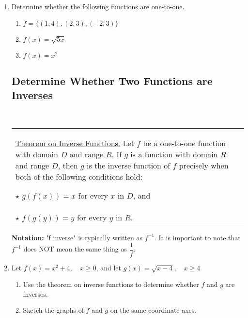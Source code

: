 \begin{enumerate}
\item Determine whether the following functions are one-to-one.
\begin{enumerate}
\item $f=\{(1,4), (2,3), (-2,3)\}$
  \vfill
\item $f(x) = \sqrt{5x}$
  \vfill
\item $f(x) = x^2$
  \vfill
\end{enumerate}



\clearpage


\subsection{Determine Whether Two Functions are Inverses} ~


\noindent \begin{tabular}{ | p{} |} \hline \noindent
\underline{Theorem on Inverse Functions.} Let $f$ be a one-to-one
function with domain $D$ and range $R$. If $g$ is a function with
domain $R$ and range $D$, then $g$ is the inverse function of $f$
precisely when both of the following conditions hold:

$ \star$ \quad $g(f(x))=x$ for every $x$ in $D$, and \\
$ \star$ \quad $f(g(y))=y$ for every $y$ in $R$.\\ \hline
\end{tabular} 

\noindent \textbf{Notation:} "f inverse" is typically written as
$f^{-1}$. It is important to note that $f^{-1}$ does NOT mean the same
thing as $\dfrac{1}{f}$.

\item Let $f(x) = x^2+4, \quad x \geq 0$, and let $g(x) = \sqrt{x-4}, \quad x \geq 4 $
\begin{enumerate}
\item Use the theorem on inverse functions to determine whether $f$
      and $g$ are inverses.

\vfill

\item Sketch the graphs of $f$ and $g$ on the same coordinate axes. \samepage \\
\end{enumerate}
\end{enumerate}
